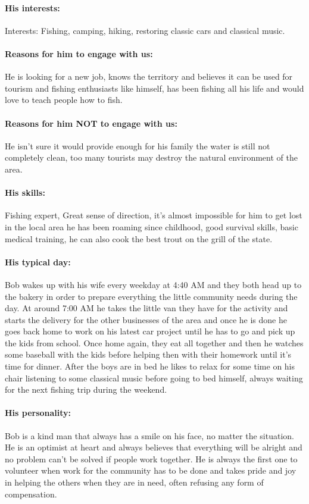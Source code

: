\paragraph*{His interests:}
Interests: Fishing, camping, hiking, restoring classic cars and classical music. 
\paragraph*{Reasons for him to engage with us:}
He is looking for a new job, knows the territory and believes it can be used for tourism and fishing enthusiasts like himself, has been fishing all his life and would love to teach people how to fish.
\paragraph*{Reasons for him NOT to engage with us:}
He isn't sure it would provide enough for his family the water is still not completely clean, too many tourists may destroy the natural environment of the area.
\paragraph*{His skills:}
Fishing expert, Great sense of direction, it's almost impossible for him to get lost in the local area he has been roaming since childhood, good survival skills, basic medical training, he can also cook the best trout on the grill of the state.
\paragraph*{His typical day:}
Bob wakes up with his wife every weekday at 4:40 AM and they both head up to the bakery in order to prepare everything the little community needs during the day. At around 7:00 AM he takes the little van they have for the activity and starts the delivery for the other businesses of the area and once he is done he goes back home to work on his latest car project until he has to go and pick up the kids from school. Once home again, they eat all together and then he watches some baseball with the kids before helping then with their homework until it's time for dinner. After the boys are in bed he likes to relax for some time on his chair listening to some classical music before going to bed himself, always waiting for the next fishing trip during the weekend.
\paragraph*{His personality:}
Bob is a kind man that always has a smile on his face, no matter the situation. He is an optimist at heart and always believes that everything will be alright and no problem can't be solved if people work together. He is always the first one to volunteer when work for the community has to be done and takes pride and joy in helping the others when they are in need, often refusing any form of compensation. 
